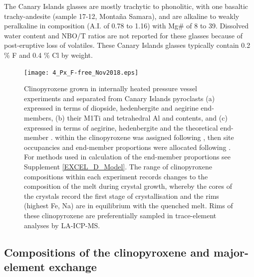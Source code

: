 \documentclass[review,authoryear,12pt]{elsarticle}
\begin{document}
The Canary Islands glasses are mostly trachytic to phonolitic, with one basaltic trachy-andesite (sample 17-12, Monta\~na Samara), and are alkaline to weakly peralkaline in composition (A.I. of  0.78 to 1.16) with Mg\# of 8 to 39. Dissolved water content and NBO/T ratios are not reported for these glasses because of post-eruptive loss of volatiles. These Canary Islands glasses typically contain 0.2 \% F and 0.4 \% Cl by weight.

        \begin{figure}[t]
        \begin{center}
        \texttt{[image: 4\_Px\_F-free\_Nov2018.eps]}
        \caption[Major-element compositions of clinopyroxene grown in internally heated pressure vessel experiments]
        {Clinopyroxene grown in internally heated pressure vessel experiments and separated from Canary Islands pyroclasts (a) expressed in terms of  diopside, hedenbergite and aegirine end-members, (b) their M1Ti and tetrahedral Al and  contents, and (c) expressed in terms of aegirine, hedenbergite and the theoretical  end-member \citep{Akasaka1980}. 
         within the clinopyroxene was assigned following \citet{Droop1987}, then site occupancies and end-member proportions were allocated following \citet{Morimoto1989}. For methods used in calculation of the end-member proportions see Supplement \ref{EXCEL_D_Model}.
        The range of clinopyroxene compositions within each experiment records changes to the composition of the melt during crystal growth, whereby the cores of the crystals record the first stage of crystallisation and the rims (highest Fe, Na) are in equilibrium with the quenched melt. Rims of these clinopyroxene are preferentially sampled in trace-element analyses by LA-ICP-MS.
        }
        \label{Px_Maj}
        \end{center}
        \end{figure}




\subsection{Compositions of the clinopyroxene and major-element exchange}
 
\end{document}
